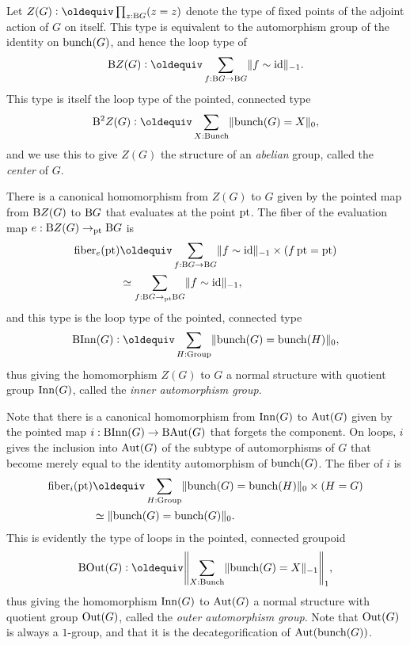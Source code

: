 \begin{definition}
  Let $Z(G) \defeq \prod_{z : \B G}(z = z)$ denote the type of fixed points of the adjoint action of $G$ on itself.
  This type is equivalent to the automorphism group of the identity on $\operatorname{bunch}(G)$,
  and hence the loop type of
  \[
    \B Z(G) \defeq \sum_{f : \B G \to \B G} \merely{f \sim \id}.
  \]
  This type is itself the loop type of the pointed, connected type
  \[
    \B^2Z(G) \defeq \sum_{X : \Bunch}\Trunc{\bunch(G) = X}_0,
  \]
  and we use this to give $Z(G)$ the structure of an \emph{abelian} group,
  called the \emph{center} of $G$.
\end{definition}
There is a canonical homomorphism from $Z(G)$ to $G$ given by the pointed map
from $\operatorname{B}\! Z(G)$ to $\operatorname{B}\! G$ that evaluates at the point ${\mathord{\mathrm{pt}}}$.
The fiber of the evaluation map $e : \operatorname{B}\! Z(G) \to_{\mathord{\mathrm{pt}}} \operatorname{B}\! G$ is
\begin{align*}
  \fiber_e(\pt)
  &\jdeq \sum_{f : \B G \to \B G} \merely{f \sim \id} \times (\mathop f \pt = \pt) \\
  &\equiv \sum_{f : \B G \to_\pt \B G} \merely{f \sim \id},
\end{align*}
and this type is the loop type of the pointed, connected type
\[
  \B\Inn(G) \defeq \sum_{H : \Group} \Trunc{\bunch(G) = \bunch(H)}_0,
\]
thus giving the homomorphism $Z(G)$ to $G$ a normal structure with
quotient group $\operatorname{Inn}(G)$, called the \emph{inner automorphism group}.

Note that there is a canonical homomorphism from $\operatorname{Inn}(G)$ to $\operatorname{Aut}(G)$
given by the pointed map $i : \operatorname{B}\!\operatorname{Inn}(G) \to \operatorname{B}\!\operatorname{Aut}(G)$ that forgets the component.
On loops, $i$ gives the inclusion into $\operatorname{Aut}(G)$ of the subtype of automorphisms of $G$
that become merely equal to the identity automorphism of $\operatorname{bunch}(G)$.
The fiber of $i$ is
\begin{align*}
  \fiber_i(\pt)
  &\jdeq \sum_{H : \Group} \Trunc{\bunch(G) = \bunch(H)}_0 \times (H = G) \\
  &\equiv \Trunc{\bunch(G) = \bunch(G)}_0.
\end{align*}
This is evidently the type of loops in the pointed, connected groupoid
\[
  \B\Out(G) \defeq \Trunc*{\sum_{X : \Bunch}\merely{\bunch(G) = X}}_1,
\]
thus giving the homomorphism $\operatorname{Inn}(G)$ to $\operatorname{Aut}(G)$ a normal structure with
quotient group $\operatorname{Out}(G)$, called the \emph{outer automorphism group}.
Note that $\operatorname{Out}(G)$ is always a $1$-group,
and that it is the decategorification of $\operatorname{Aut}(\operatorname{bunch}(G))$.

